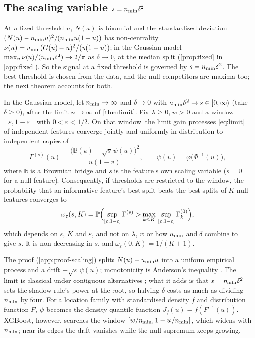 \subsection{The scaling variable \texorpdfstring{$s = \nmin\delta^2$}{s}}\label{sec:scaling}

At a fixed threshold $u$, $N(u)$ is binomial and the standardised deviation $(N(u)-\nmin u)^2/(\nmin u(1-u))$ has non-centrality $\nu(u) = \nmin(G(u)-u)^2/(u(1-u))$; in the Gaussian model $\max_u\nu(u)/(\nmin\delta^2) \to 2/\pi$ as $\delta\to 0$, at the median split (\cref{prop:fixed} in \cref{app:fixed}). So the signal at a fixed threshold is governed by $s = \nmin\delta^2$. The best threshold is chosen from the data, and the null competitors are maxima too; the next theorem accounts for both.

\begin{theorem}\label{thm:scaling}
In the Gaussian model, let $\nmin \to \infty$ and $\delta \to 0$ with $\nmin\delta^2 \to s \in [0,\infty)$ (take $\delta \ge 0$), after the limit $n\to\infty$ of \cref{thm:limit}. Fix $\lambda \ge 0$, $w > 0$ and a window $[\varepsilon, 1-\varepsilon]$ with $0 < \varepsilon < 1/2$. On that window, the limit gain processes \eqref{eq:limit} of independent features converge jointly and uniformly in distribution to independent copies of
\begin{equation}\label{eq:bridge}
  \Gamma^{(s)}(u) = \frac{\bigl(\mathbb B(u) - \sqrt s\,\psi(u)\bigr)^2}{u(1-u)},\qquad \psi(u) = \varphi\bigl(\Phi^{-1}(u)\bigr),
\end{equation}
where $\mathbb B$ is a Brownian bridge and $s$ is the feature's own scaling variable ($s = 0$ for a null feature). Consequently, if thresholds are restricted to the window, the probability that an informative feature's best split beats the best splits of $K$ null features converges to
\[
  \omega_\varepsilon(s,K) = \P\Bigl(\sup_{[\varepsilon,1-\varepsilon]}\Gamma^{(s)} > \max_{k\le K}\,\sup_{[\varepsilon,1-\varepsilon]}\Gamma^{(0)}_k\Bigr),
\]
which depends on $s$, $K$ and $\varepsilon$, and not on $\lambda$, $w$ or how $\nmin$ and $\delta$ combine to give $s$. It is non-decreasing in $s$, and $\omega_\varepsilon(0,K) = 1/(K+1)$.
\end{theorem}

The proof (\cref{app:proof-scaling}) splits $N(u) - \nmin u$ into a uniform empirical process and a drift $-\sqrt s\,\psi(u)$; monotonicity is Anderson's inequality \citep{anderson1955integral}. The limit is classical under contiguous alternatives \citep{miller1982maximally,lausen1992maximally,hothorn2008generalized}; what it adds is that $s = \nmin\delta^2$ sets the shadow rule's power at the root, so halving $\delta$ costs as much as dividing $\nmin$ by four. For a location family with standardised density $f$ and distribution function $F$, $\psi$ becomes the density-quantile function $J_f(u) = f(F^{-1}(u))$. XGBoost, however, searches the window $[w/\nmin, 1-w/\nmin]$, which widens with $\nmin$; near its edges the drift vanishes while the null supremum keeps growing.

